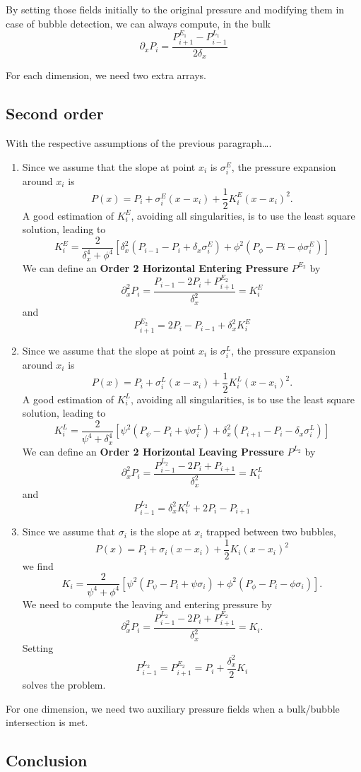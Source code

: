 \documentclass[aps]{revtex4}
\begin{document}
By setting those fields initially to the original pressure and modifying them in case of bubble detection,
we can always compute, in the bulk
$$
	\partial_x P_i = \dfrac{P^{E_1}_{i+1} - P^{L_1}_{i-1}}{2\delta_x}
$$

For each dimension, we need two extra arrays.

\subsection{Second order}
With the respective assumptions of the previous paragraph….
\begin{enumerate}

\item Since we assume that the slope at point $x_i$ is $\sigma_i^E$, the pressure expansion around $x_i$ 
is
$$
	P(x) = P_i + \sigma_i^E \left(x-x_i\right) + \frac{1}{2} K_i^E \left(x-x_i\right)^2.
$$
A good estimation of $K_i^E$, avoiding all singularities, is to use the least square solution,
leading to
$$
	K_i^E = \dfrac{2}{\delta_x^4+\phi^4}
	\left\lbrack
		\delta_x^2\left(P_{i-1}-P_{i} + \delta_x \sigma_i^E\right) + \phi^2\left(P_\phi - Pi - \phi\sigma_i^E\right)
	\right\rbrack
$$
We can define an \textbf{Order 2 Horizontal Entering Pressure} $P^{E_2}$ by
$$
	\partial_x^2 P_i = \dfrac{P_{i-1}-2P_i + P^{E_2}_{i+1}}{\delta_x^2} = K_i^E
$$
and
$$
	P^{E_2}_{i+1} = 2P_i - P_{i-1} + \delta_x^2 K_i^E
$$
\item
Since we assume that the slope at point $x_i$ is $\sigma_i^L$, the pressure expansion around $x_i$ 
is
$$
	P(x) = P_i + \sigma_i^L \left(x-x_i\right) + \frac{1}{2} K_i^L \left(x-x_i\right)^2.
$$
A good estimation of $K_i^L$, avoiding all singularities, is to use the least square solution,
leading to
$$
	K_i^L = \dfrac{2}{\psi^4+\delta_x^4}
	\left\lbrack
		\psi^2\left(P_\psi - P_i + \psi \sigma_i^L\right) +
		\delta_x^2\left(P_{i+1}-P_i - \delta_x \sigma_i^L\right)
	\right\rbrack
$$
We can define an \textbf{Order 2 Horizontal Leaving Pressure} $P^{L_2}$ by
$$
	\partial_x^2 P_i = \dfrac{ 
	P^{L_2}_{i-1}
	-2P_i 
	+ P_{i+1}
	}
	{\delta_x^2}
	 = K_i^L
$$
and
$$
	P^{L_2}_{i-1} = \delta_x^2 K_i^L + 2P_i - P_{i+1}
$$
\item
Since we assume that $\sigma_i$ is the slope at $x_i$ trapped between two bubbles,
$$
	P(x) = P_i + \sigma_i \left(x-x_i\right) + \dfrac{1}{2} K_i  \left(x-x_i\right)^2
$$
we find
$$
	K_i = \dfrac{2}{\psi^4+\phi^4}
	\left\lbrack
	\psi^2\left(P_\psi - P_i + \psi \sigma_i \right) + 
	\phi^2\left(P_\phi - P_i - \phi \sigma_i \right)
	\right\rbrack.
$$
We need to compute the leaving and entering pressure by
$$
	\partial_x^2 P_i = \dfrac{P^{L_2}_{i-1} - 2P_i + P^{E_2}_{i+1}}{\delta_x^2} = K_i.
$$
Setting
$$
	P^{L_2}_{i-1} = P^{E_2}_{i+1} = P_i + \dfrac{\delta_x^2}{2} K_i
$$
solves the problem.
\end{enumerate}

For one dimension, we need two auxiliary pressure fields when a bulk/bubble intersection is met.

\subsection{Conclusion}
\end{document}
